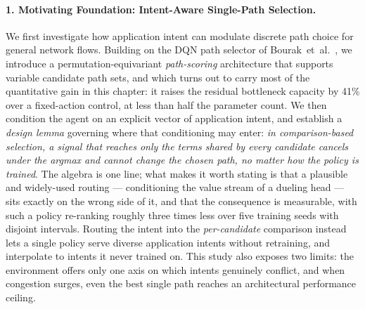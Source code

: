 \paragraph{1. Motivating Foundation: Intent-Aware Single-Path Selection.} We first investigate how application intent can modulate discrete path choice for general network flows. Building on the DQN path selector of Bourak~et~al.~\cite{Bourak2025}, we introduce a permutation-equivariant \emph{path-scoring} architecture that supports variable candidate path sets, and which turns out to carry most of the quantitative gain in this chapter: it raises the residual bottleneck capacity by 41\% over a fixed-action control, at less than half the parameter count. We then condition the agent on an explicit vector of application intent, and establish a \emph{design lemma} governing where that conditioning may enter: \emph{in comparison-based selection, a signal that reaches only the terms shared by every candidate cancels under the argmax and cannot change the chosen path, no matter how the policy is trained}. The algebra is one line; what makes it worth stating is that a plausible and widely-used routing --- conditioning the value stream of a dueling head --- sits exactly on the wrong side of it, and that the consequence is measurable, with such a policy re-ranking roughly three times less over five training seeds with disjoint intervals. Routing the intent into the \emph{per-candidate} comparison instead lets a single policy serve diverse application intents without retraining, and interpolate to intents it never trained on. This study also exposes two limits: the environment offers only one axis on which intents genuinely conflict, and when congestion surges, even the best single path reaches an architectural performance ceiling.

